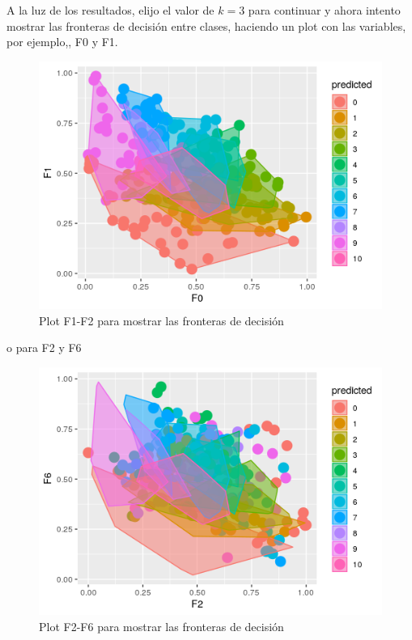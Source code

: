A la luz de los resultados, elijo el valor de $k=3$ para continuar y ahora intento mostrar las fronteras de decisión entre clases, haciendo un plot con las variables, por ejemplo,, F0 y F1.

\begin{figure}[H] %
	\centering
	\includegraphics[scale=0.8]{boundaries-knn.png}  %
	\caption{Plot F1-F2 para mostrar las fronteras de decisión} 
	\label{fig:boundaries-knn}
\end{figure}

o para F2 y F6

\begin{figure}[H] %
	\centering
	\includegraphics[scale=0.8]{boundariesf2f6-knn.png}  %
	\caption{Plot F2-F6 para mostrar las fronteras de decisión} 
	\label{fig:boundaries-knn-f2f6}
\end{figure}

